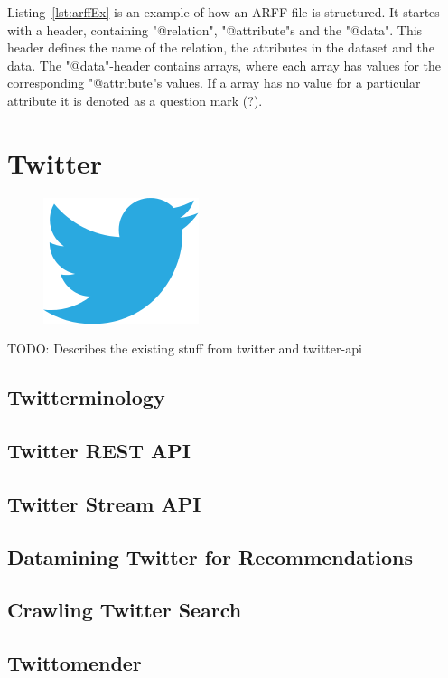 Listing~\ref{lst:arffEx} is an example of how an ARFF file is structured. It startes with a header, containing "@relation", "@attribute"s and the "@data". This header defines the name of the relation, the attributes in the dataset and the data. The "@data"-header contains arrays, where each array has values for the corresponding "@attribute"s values. If a array has no value for a particular attribute it is denoted as a question mark (?).




\section{Twitter}

\begin{figure}
\vspace{-30pt}
\centering
\includegraphics[width = .25\textwidth]{image/twitter-logo.png}
\end{figure}

TODO:
Describes the existing stuff from twitter and twitter-api
\subsection{Twitterminology}
\subsection{Twitter REST API}
\subsection{Twitter Stream API}
\subsection{Datamining Twitter for Recommendations}
\subsection{Crawling Twitter Search}
\subsection{Twittomender}




